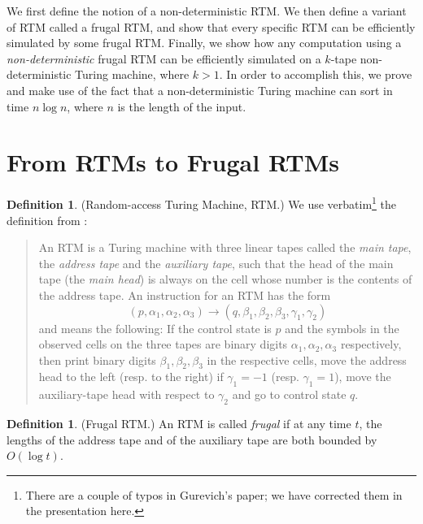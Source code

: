 \documentclass[english]{article}
\theoremstyle{plain}
\theoremstyle{definition}
\newtheorem{defn}[thm]{Definition}
\theoremstyle{plain}
\begin{document}
We first define the notion of a non-deterministic RTM. We then define
a variant of RTM called a frugal RTM, and show that every specific RTM
can be efficiently simulated by some frugal RTM. Finally, we show how
any computation using a \emph{non-deterministic} frugal RTM can be
efficiently simulated on a $k$-tape non-deterministic Turing machine,
where $k>1$. In order to accomplish this, we prove and make use of the
fact that a non-deterministic Turing machine can sort in time $n \log
n$, where $n$ is the length of the input.

\section{From RTMs to Frugal RTMs}

\begin{defn}
  (Random-access Turing Machine, RTM.) We use verbatim\footnote{There
    are a couple of typos in Gurevich's paper; we have corrected them
    in the presentation here.} the definition from
  \cite{DBLP:conf/ershov/GurevichS89}:

  \begin{quote}
    An RTM is a Turing machine with three linear tapes called the
    \emph{main tape}, the \emph{address tape} and the \emph{auxiliary
      tape}, such that the head of the main tape (the \emph{main
      head}) is always on the cell whose number is the contents of the
    address tape. An instruction for an RTM has the form
    \begin{equation*}
      (p,\alpha_1,\alpha_2,\alpha_3) \rightarrow
      (q,\beta_1,\beta_2,\beta_3,\gamma_1,\gamma_2)
    \end{equation*}
    and means the following: If the control state is $p$ and the
    symbols in the observed cells on the three tapes are binary digits
    $\alpha_1,\alpha_2,\alpha_3$ respectively, then print binary
    digits $\beta_1,\beta_2,\beta_3$ in the respective cells, move the
    address head to the left (resp. to the right) if $\gamma_1=-1$
    (resp. $\gamma_1=1$), move the auxiliary-tape head with respect
    to $\gamma_2$ and go to control state $q$.
  \end{quote}
\end{defn}

\begin{defn}
  (Frugal RTM.) An RTM is called \emph{frugal} if at any time $t$, the
  lengths of the address tape and of the auxiliary tape are both
  bounded by $O(\log t)$.
\end{defn}
\end{document}
